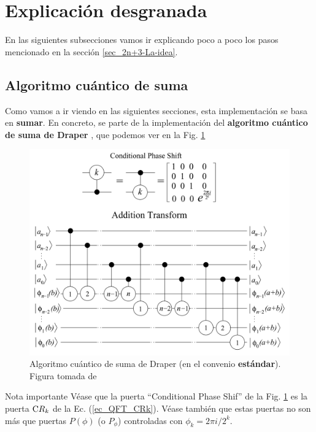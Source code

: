 \documentclass[a4paper,11pt]{book} %
\numberwithin{equation}{chapter}
\newcommand{\cg}[1]{{\rm C}#1}
\begin{document}
\section{Explicación desgranada}

En las siguientes subsecciones vamos ir explicando poco a poco los pasos mencionado en la sección \ref{sec_2n+3-La-idea}.

\subsection{Algoritmo cuántico de suma} \label{sec_2n+3-Suma}

Como vamos a ir viendo en las siguientes secciones, esta implementación se basa en \textbf{sumar}. En concreto, se parte de la implementación del \textbf{algoritmo cuántico de suma de Draper} \cite{bib_Addition}, que podemos ver en la Fig. \ref{Fig_idea_suma}

\begin{figure}[t]
\centering 
\includegraphics[width=0.8\linewidth]{Figuras/Fig-Addition-Transform.png}
\caption{Algoritmo cuántico de suma de Draper (en el convenio \textbf{estándar}). Figura tomada de \cite{bib_2n+3}}
\label{Fig_idea_suma}
\end{figure}

\begin{mybox_blue}{Nota importante}
Véase que la puerta ``Conditional Phase Shif'' de la Fig. \ref{Fig_idea_suma} es la puerta $\cg{R_k}$ de la Ec. (\ref{ec_QFT_CRk}). Véase también que estas puertas no son más que puertas $P(\phi)$ (o $P_\phi$) controladas con $\phi_k =  2\pi i/2^k$.
\end{mybox_blue}
\end{document}
